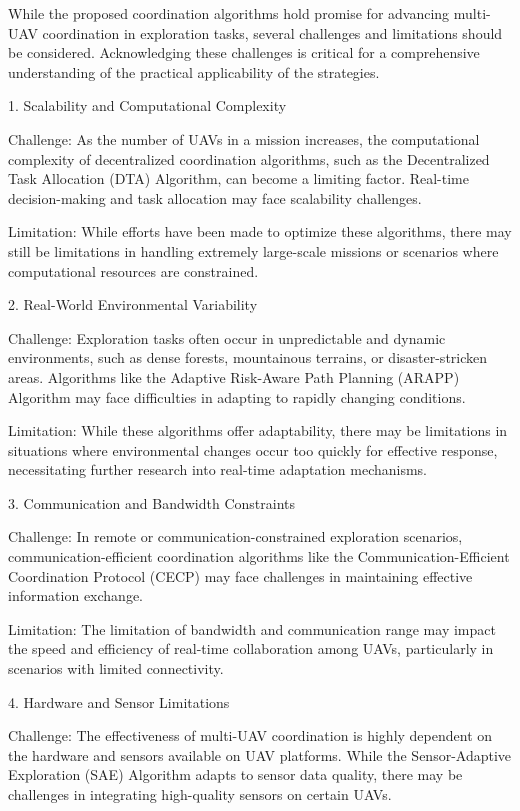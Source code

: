 \documentclass[sigconf]{acmart}
\begin{document}
While the proposed coordination algorithms hold promise for advancing multi-UAV coordination in exploration tasks, several challenges and limitations should be considered. Acknowledging these challenges is critical for a comprehensive understanding of the practical applicability of the strategies.

1. Scalability and Computational Complexity

    Challenge: As the number of UAVs in a mission increases, the computational complexity of decentralized coordination algorithms, such as the Decentralized Task Allocation (DTA) Algorithm, can become a limiting factor. Real-time decision-making and task allocation may face scalability challenges.

    Limitation: While efforts have been made to optimize these algorithms, there may still be limitations in handling extremely large-scale missions or scenarios where computational resources are constrained.

2. Real-World Environmental Variability

    Challenge: Exploration tasks often occur in unpredictable and dynamic environments, such as dense forests, mountainous terrains, or disaster-stricken areas. Algorithms like the Adaptive Risk-Aware Path Planning (ARAPP) Algorithm may face difficulties in adapting to rapidly changing conditions.

    Limitation: While these algorithms offer adaptability, there may be limitations in situations where environmental changes occur too quickly for effective response, necessitating further research into real-time adaptation mechanisms.

3. Communication and Bandwidth Constraints

    Challenge: In remote or communication-constrained exploration scenarios, communication-efficient coordination algorithms like the Communication-Efficient Coordination Protocol (CECP) may face challenges in maintaining effective information exchange.

    Limitation: The limitation of bandwidth and communication range may impact the speed and efficiency of real-time collaboration among UAVs, particularly in scenarios with limited connectivity.

4. Hardware and Sensor Limitations

    Challenge: The effectiveness of multi-UAV coordination is highly dependent on the hardware and sensors available on UAV platforms. While the Sensor-Adaptive Exploration (SAE) Algorithm adapts to sensor data quality, there may be challenges in integrating high-quality sensors on certain UAVs.
\end{document}
